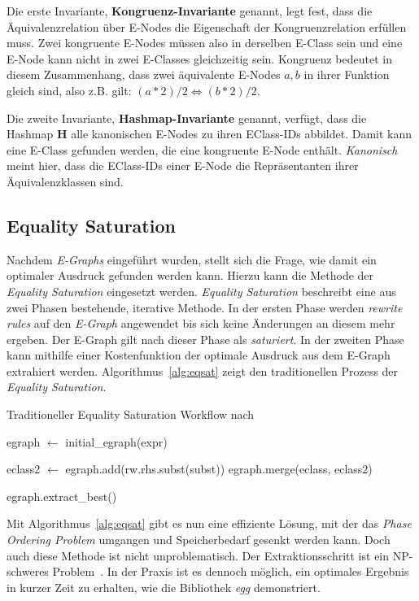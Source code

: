 Die erste Invariante, \textbf{Kongruenz-Invariante} genannt, legt fest, dass die Äquivalenzrelation über E-Nodes die Eigenschaft der Kongruenzrelation erfüllen muss.
Zwei kongruente E-Nodes müssen also in derselben E-Class sein und eine E-Node kann nicht in zwei E-Classes gleichzeitig sein.
Kongruenz bedeutet in diesem Zusammenhang, dass zwei äquivalente E-Nodes $a, b$ in ihrer Funktion gleich sind, also z.B. gilt: $(a * 2) / 2 \Leftrightarrow (b * 2) / 2$.

Die zweite Invariante, \textbf{Hashmap-Invariante} genannt, verfügt, dass die Hashmap $\mathbf{H}$ alle kanonischen E-Nodes zu ihren EClass-IDs abbildet.
Damit kann eine E-Class gefunden werden, die eine kongruente E-Node enthält. \textit{Kanonisch} meint hier, dass die EClass-IDs einer E-Node die Repräsentanten ihrer Äquivalenzklassen sind.

\subsection{Equality Saturation}

Nachdem \textit{E-Graphs} eingeführt wurden, stellt sich die Frage, wie damit ein optimaler Ausdruck gefunden werden kann.
Hierzu kann die Methode der \textit{Equality Saturation} eingesetzt werden.
\textit{Equality Saturation} beschreibt eine aus zwei Phasen bestehende, iterative Methode.
In der ersten Phase werden \textit{rewrite rules} auf den \textit{E-Graph} angewendet bis sich keine Änderungen an diesem mehr ergeben.
Der E-Graph gilt nach dieser Phase als \textit{saturiert}.
In der zweiten Phase kann mithilfe einer Kostenfunktion der optimale Ausdruck aus dem E-Graph extrahiert werden.
Algorithmus~\ref{alg:eqsat} zeigt den traditionellen Prozess der \textit{Equality Saturation}.

\begin{algorithm}[H]
  \caption{Traditioneller Equality Saturation Workflow nach~\cite{2021-egg}}\label{alg:eqsat}
  \begin{algorithmic}
    \State egraph $\gets$ initial\_egraph(expr)
    
      
          \State  eclass2 $\gets$ egraph.add(rw.rhs.subst(subst))
          \State egraph.merge(eclass, eclass2)
        \EndFor 
      \EndFor
    \EndWhile

    \State \Return egraph.extract\_best()
    \EndFunction
  \end{algorithmic}
\end{algorithm}

Mit Algorithmus~\ref{alg:eqsat} gibt es nun eine effiziente Lösung, mit der das \textit{Phase Ordering Problem} umgangen und Speicherbedarf gesenkt werden kann.
Doch auch diese Methode ist nicht unproblematisch. Der Extraktionsschritt ist ein NP-schweres Problem~\cite{phaseorder-2009}. In der Praxis ist es dennoch möglich, ein optimales
Ergebnis in kurzer Zeit zu erhalten, wie die Bibliothek \textit{egg} demonstriert.  
